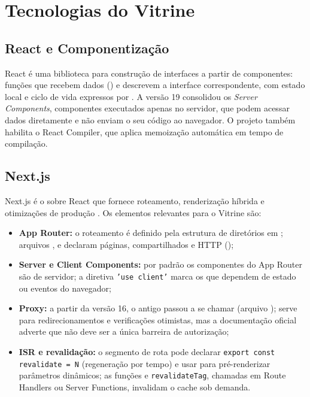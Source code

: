 \section{Tecnologias do Vitrine}\label{sec:fund-tecnologias}

\subsection{React e Componentização}

React é uma biblioteca para construção de interfaces a partir de componentes: funções que recebem dados () e descrevem a interface correspondente, com estado local e ciclo de vida expressos por  \cite{reactdocs,fedosejev2015react}. A versão 19 consolidou os \emph{Server Components}, componentes executados apenas no servidor, que podem acessar dados diretamente e não enviam o seu código ao navegador. O projeto também habilita o React Compiler, que aplica memoização automática em tempo de compilação.

\subsection{Next.js}\label{sec:fund-nextjs}

Next.js é o  sobre React que fornece roteamento, renderização híbrida e otimizações de produção \cite{nextjsdocs,konshin2018next}. Os elementos relevantes para o Vitrine são:

\begin{itemize}
  \item \textbf{App Router:} o roteamento é definido pela estrutura de diretórios em ; arquivos ,  e  declaram páginas,  compartilhados e  HTTP ();
  \item \textbf{Server e Client Components:} por padrão os componentes do App Router são de servidor; a diretiva \texttt{'use client'} marca os que dependem de estado ou eventos do navegador;
  \item \textbf{Proxy:} a partir da versão 16, o antigo  passou a se chamar  (arquivo ); serve para redirecionamentos e verificações otimistas, mas a documentação oficial adverte que não deve ser a única barreira de autorização;
  \item \textbf{ISR e revalidação:} o segmento de rota pode declarar \texttt{export const revalidate = N} (regeneração por tempo) e usar  para pré-renderizar parâmetros dinâmicos; as funções  e \texttt{revalidateTag}, chamadas em Route Handlers ou Server Functions, invalidam o cache sob demanda.
\end{itemize}

